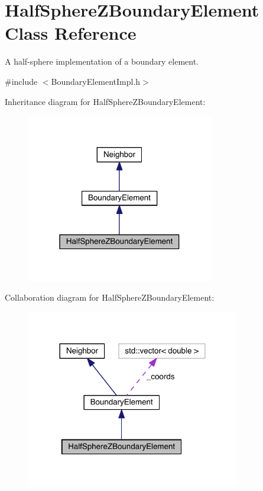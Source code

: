 \hypertarget{classHalfSphereZBoundaryElement}{\section{Half\+Sphere\+Z\+Boundary\+Element Class Reference}
\label{classHalfSphereZBoundaryElement}
}


A half-\/sphere implementation of a boundary element.  




{\ttfamily \#include $<$Boundary\+Element\+Impl.\+h$>$}



Inheritance diagram for Half\+Sphere\+Z\+Boundary\+Element\+:\nopagebreak
\begin{figure}[H]
\begin{center}
\leavevmode
\includegraphics[width=232pt]{classHalfSphereZBoundaryElement__inherit__graph}
\end{center}
\end{figure}


Collaboration diagram for Half\+Sphere\+Z\+Boundary\+Element\+:\nopagebreak
\begin{figure}[H]
\begin{center}
\leavevmode
\includegraphics[width=264pt]{classHalfSphereZBoundaryElement__coll__graph}
\end{center}
\end{figure}
